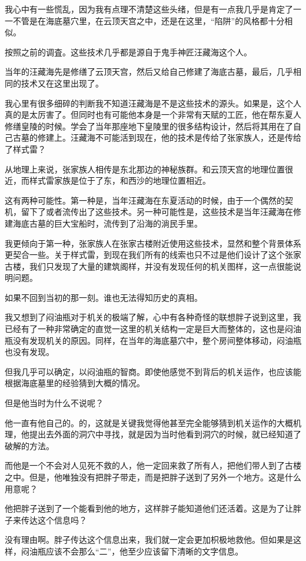 我心中有一些慌乱，因为我有点理不清楚这些头绪，但是有一点我几乎是肯定了一一不管是在海底墓穴里，在云顶天宫之中，还是在这里，“陷阱”的风格都十分相似。

按照之前的调査。这些技术几乎都是源自于鬼手神匠汪藏海这个人。

当年的汪藏海先是修缮了云顶天宫，然后又给自己修建了海底古墓，最后，几乎相同的技术又在这里出现了。

我心里有很多细碎的判断我不知道汪藏海是不是这些技术的源头。如果是，这个人真的是太厉害了。但同时也有可能他本身是一个非常有天赋的工匠，他在帮东夏人修缮皇陵的时候。学会了当年那座地下皇陵里的很多结构设计，然后将其用在了自己古墓的修建上。汪藏海不可能活到现在，他的技术是传给了张家族人，还是传给了样式雷？

从地理上来说，张家族人相传是东北那边的神秘族群。和云顶天宫的地理位置很近，而样式雷家族是位于了东，和西沙的地理位置相近。

这有两种可能性。第一种是，当年汪藏海在东夏活动的时候，由于一个偶然的契机，留下了或者流传出了这些技术。另一种可能性是，这些技术是当年汪藏海在修建海底古墓的巨大宝船时，流传到了沿海的淌民手里。

我更倾向于第一种，张家族人在张家古楼附近使用这些技术，显然和整个背景体系更契合一些。关于样式雷，到现在我们所有的线索也只不过是他们设计了这个张家古楼，我们只发现了大量的建筑阁样，并没有发现任何的机关图样，这一点很能说明问题。

如果不回到当初的那一刻。谁也无法得知历史的真相。

我又想到了闷油瓶对于机关的极端了解，心中有各种奇怪的联想胖子说到这里，我已经有了一种非常确定的直觉一这里的机关结构一定是巨大而整体的，这也是闷油瓶没有发现机关的原因。同样，在当年的海底墓穴中，整个房间整体移动，闷油瓶也没有发现。

但我几乎可以确定，以闷油瓶的智商。即使他感觉不到背后的机关运作，也应该能根据海底墓里的经验猜到大概的情况。

但是他当时为什么不说呢？

他一直有他自己的。的，这就是关键我觉得他甚至完全能够猜到机关运作的大概机理，他提出去外面的洞穴中寻找，就是因为当时他看到洞穴的时候，就已经知道了破解的方法。

而他是一个不会对人见死不救的人，他一定回来救了所有人，把他们带人到了古楼之中。但是，他唯独没有把胖子带走，而是把胖子送到了另外一个地方。这是什么用意呢？

他把胖子送到了一个能看到他的地方，这样胖子能知道他们还活着。这是为了让胖子来传达这个信息吗？

没有理由啊。胖子传达这个信息出来，我们就一定会更加枳极地救他。但如果是这样，闷油瓶应该不会那么“二”，他至少应该留下清晰的文字信息。

